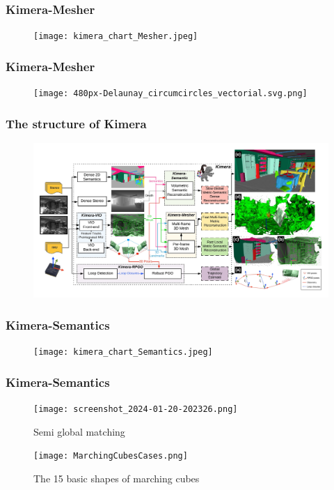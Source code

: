 \documentclass[11pt]{beamer}
\begin{document}
\begin{frame}
\frametitle{Kimera-Mesher}
\begin{figure}
    \texttt{[image: kimera\_chart\_Mesher.jpeg]} 
\end{figure}
\end{frame}
\begin{frame}
\frametitle{Kimera-Mesher}
\begin{minipage}{0.49\textwidth}
    \begin{figure}
        \texttt{[image: 480px-Delaunay\_circumcircles\_vectorial.svg.png]} 
    \end{figure}
\end{minipage}
\begin{minipage}{0.49\textwidth}
    \begin{figure}[ht]
        \centering
    \end{figure}
\end{minipage}
\end{frame}
\begin{frame}
\frametitle{The structure of Kimera}
\begin{figure}
    \includegraphics[width=\linewidth]{kimera_chart_23.jpeg} 
\end{figure}
\end{frame}
\begin{frame}
\frametitle{Kimera-Semantics}
\begin{figure}
    \texttt{[image: kimera\_chart\_Semantics.jpeg]} 
\end{figure}
\end{frame}
\begin{frame}
\frametitle{Kimera-Semantics}
\begin{figure}
    \texttt{[image: screenshot\_2024-01-20-202326.png]} 
    \caption{Semi global matching \cite{SGM}}
\end{figure}
\begin{figure}
    \texttt{[image: MarchingCubesCases.png]} 
    \caption{The 15 basic shapes of marching cubes \cite{marchingCubesImage} }
\end{figure}
\end{frame}
\end{document}
